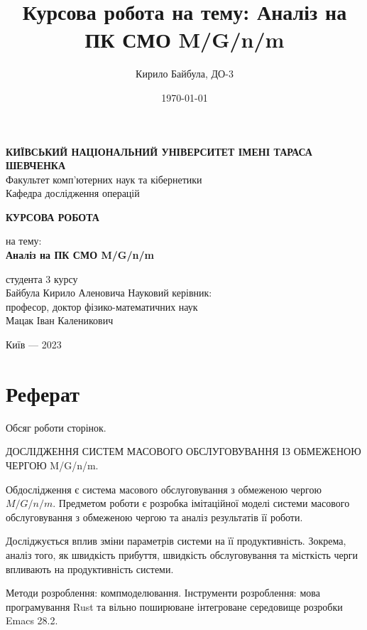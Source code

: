 \documentclass[14pt]{extarticle}
\author{Кирило Байбула, ДО-3}
\date{\today}
\title{Курсова робота на тему: Аналіз на ПК СМО M/G/n/m}
\begin{document}

\begin{titlepage}
\begin{center}
\textbf{КИЇВСЬКИЙ НАЦІОНАЛЬНИЙ УНІВЕРСИТЕТ ІМЕНІ ТАРАСА ШЕВЧЕНКА} \\
Факультет комп'ютерних наук та кібернетики \\
Кафедра дослідження операцій \\
\vspace{2cm}
{\Large \textbf{КУРСОВА РОБОТА} \par}
на тему: \\
\textbf{Аналіз на ПК СМО M/G/n/m} \\
\vspace{2cm}
{\large }
\end{center}
\begin{flushright}
\vfill
студента 3 курсу \\
Байбула Кирило Аленовича
\vfill
Науковий керівник: \\
професор, доктор фізико-математичних наук \\
Мацак Іван Каленикович
\end{flushright}
\vfill
\begin{center}
Київ --- 2023
\end{center}
\end{titlepage}

\section*{Реферат}

Обсяг роботи \pageref{LastPage} сторінок.

ДОСЛІДЖЕННЯ СИСТЕМ МАСОВОГО ОБСЛУГОВУВАННЯ ІЗ ОБМЕЖЕНОЮ ЧЕРГОЮ M/G/n/m.

Об дослідження є система масового обслуговування з обмеженою чергою
\(M/G/n/m\). Предметом роботи є розробка імітаційної моделі системи масового
обслуговування з обмеженою чергою та аналіз результатів її роботи.

Досліджується вплив зміни параметрів системи на її продуктивність. Зокрема,
аналіз того, як швидкість прибуття, швидкість обслуговування та місткість черги
впливають на продуктивність системи.

Методи розроблення: комп моделювання. Інструменти
розроблення: мова програмування Rust та вільно поширюване інтегроване середовище
розробки Emacs 28.2.

\newpage
\end{document}

